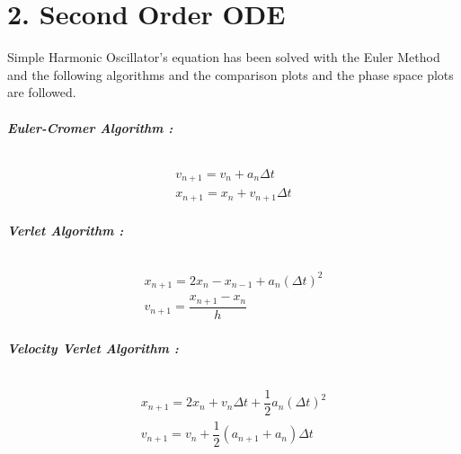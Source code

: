 \documentclass[12pt]{article}
\begin{document}
\part*{2. Second Order ODE}
Simple Harmonic Oscillator's equation has been solved with the Euler Method and the following algorithms and the comparison plots and the phase space plots are followed. 
\paragraph*{\textbf{Euler-Cromer Algorithm : }}
\begin{gather*}
v_{n+1} = v_{n} + a_{n} \Delta t \\
x_{n+1} = x_{n} + v_{n+1} \Delta t
\end{gather*}
\paragraph*{\textbf{Verlet Algorithm : }}
\begin{gather*}
x_{n+1} = 2x_{n} - x_{n-1} + a_{n} (\Delta t)^{2}\\
v_{n+1} = \dfrac{x_{n+1} - x_{n}}{h}
\end{gather*}
\paragraph*{\textbf{Velocity Verlet Algorithm : }}
\begin{gather*}
x_{n+1} = 2x_{n} + v_{n} \Delta t + \dfrac{1}{2}a_{n} (\Delta t)^{2}\\
v_{n+1} = v_{n} + \dfrac{1}{2} (a_{n+1} + a_{n}) \Delta t
\end{gather*}
\end{document}
